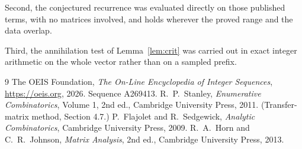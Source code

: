 \documentclass[11pt,a4paper]{article}
\theoremstyle{plain}
\theoremstyle{definition}
\begin{document}
Second, the conjectured recurrence was evaluated directly on those published terms, with no
matrices involved, and holds wherever the proved range and the data overlap.

Third, the annihilation test of Lemma~\ref{lem:crit} was carried out in exact integer
arithmetic on the whole vector rather than on a sampled prefix.

\begin{thebibliography}{9}
 The OEIS Foundation, \emph{The On-Line Encyclopedia of Integer
Sequences}, \url{https://oeis.org}, 2026. Sequence A269413.
 R.~P.~Stanley, \emph{Enumerative Combinatorics}, Volume 1, 2nd ed.,
Cambridge University Press, 2011. (Transfer-matrix method, Section 4.7.)
 P.~Flajolet and R.~Sedgewick, \emph{Analytic Combinatorics}, Cambridge
University Press, 2009.
 R.~A.~Horn and C.~R.~Johnson, \emph{Matrix Analysis}, 2nd ed., Cambridge
University Press, 2013.
\end{thebibliography}
\end{document}
